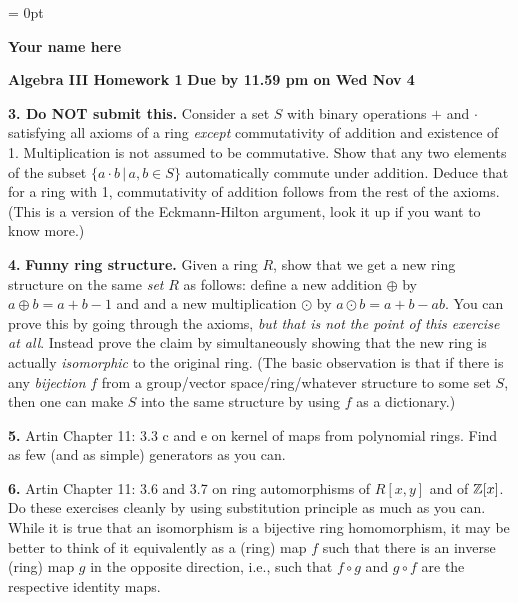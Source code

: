 \documentclass{article}
\begin{document}
\parindent = 0pt
{\centerline {\bf Your name here}}

\medskip

{\bf Algebra III Homework 1} 
\hfill {\bf Due by 11.59 pm on Wed Nov 4}

\bigskip

{\bf 3. Do NOT submit this.} Consider a set $S$ with binary operations $+$ and $\cdot$ satisfying all axioms of a ring {\it except} commutativity of addition and existence of 1. Multiplication is not assumed to be commutative. Show that any two elements of the subset $\{a \cdot b \, | \, a,b \in S\}$ automatically commute under addition. Deduce that for a ring with 1, commutativity of addition follows from the rest of the axioms. (This is a version of the Eckmann-Hilton argument, look it up if you want to know more.)

\medskip
   
{\bf 4.} {\bf Funny ring structure.}  Given a ring $R$, show that we get a new ring structure on the same {\it set} $R$ as follows: define a new addition $\oplus$ by $a \oplus b = a + b - 1$ and and a new multiplication $\odot$ by $a \odot b = a + b - ab$. You can prove this by going through the axioms, {\it but that is not the point of this exercise at all}. Instead prove the claim by simultaneously showing that the new ring is actually {\it isomorphic} to the original ring. (The basic observation is that if there is any {\it bijection} $f$ from a group/vector space/ring/whatever structure to some set $S$, then one can make $S$ into the same structure by using $f$ as a dictionary.)

\medskip


\medskip

{\bf 5.} Artin Chapter 11: 3.3 c and e on kernel of maps from polynomial rings. Find as few (and as simple) generators as you can.

\medskip

{\bf 6.} Artin Chapter 11: 3.6 and 3.7 on ring automorphisms of $R[x,y]$ and of $\Bbb Z[x]$. Do these exercises cleanly by using substitution principle as much as you can. While it is true that an isomorphism is a bijective ring homomorphism, it may be better to think of it equivalently as a (ring) map $f$ such that there is an inverse (ring) map $g$ in the opposite direction, i.e., such that  $f \circ g$ and $g \circ f$ are the respective identity maps.
\end{document}
